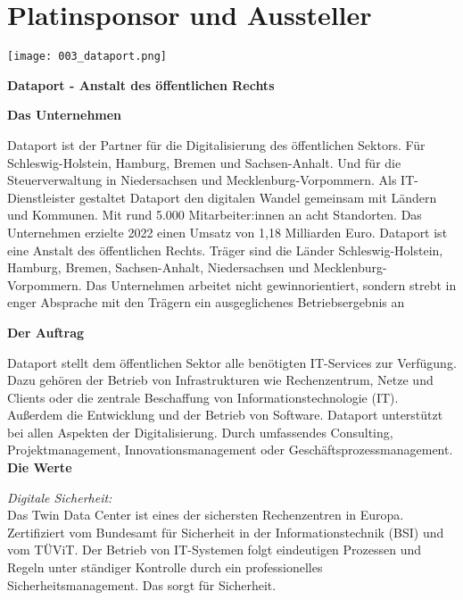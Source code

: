 \section*{Platinsponsor und Aussteller}
  \texttt{[image: 003\_dataport.png]}
  \vspace{1.0\baselineskip}
  
\noindent
    {\bfseries Dataport - Anstalt des öffentlichen Rechts}
    \vspace{1.0\baselineskip}
    
\noindent
    {\bfseries Das Unternehmen}
    
\noindent    
Dataport ist der Partner für die Digitalisierung des öffentlichen Sektors. Für Schleswig-Holstein, Hamburg, Bremen und Sachsen-Anhalt. Und für die Steuerverwaltung in Niedersachsen und Meck\-lenburg-Vorpommern. Als IT-Dienstleister gestaltet Dataport den digitalen Wandel gemeinsam mit Ländern und Kommunen. Mit rund 5.000 Mitarbeiter:innen an acht Standorten. Das Unternehmen erzielte 2022 einen Umsatz von 1,18 Milliarden Euro.    
Dataport ist eine Anstalt des öffentlichen Rechts. Träger sind die Länder Schleswig-Holstein, Hamburg, Bremen, Sachsen-Anhalt, Niedersachsen und Meck\-lenburg-Vorpommern. Das Unternehmen arbeitet nicht gewinnorientiert, sondern strebt in enger Absprache mit den Trägern ein ausgeglichenes Betriebsergebnis an
\vspace{1.0\baselineskip}

\noindent
{\bfseries Der Auftrag}

\noindent
Dataport stellt dem öffentlichen Sektor alle benötigten IT-Services zur Verfügung. Dazu gehören der Betrieb von Infrastrukturen wie Rechenzentrum, Netze und Clients oder die zentrale Beschaffung von Informationstechnologie (IT). Außerdem die Entwicklung und der Betrieb von Software. Dataport unterstützt bei allen Aspekten der Digitalisierung. Durch umfassendes Consulting, Projektmanagement, Innovationsmanagement oder Geschäftsprozessmanagement.
\newpage
\noindent
{\bfseries Die Werte}
\vspace{1.0\baselineskip}

\noindent
{\em Digitale Sicherheit:}\\
Das Twin Data Center ist eines der sichersten Rechenzentren in Europa. Zertifiziert vom Bundesamt für Sicherheit in der Informationstechnik (BSI) und vom TÜViT. Der Betrieb von IT-Systemen folgt eindeutigen Prozessen und Regeln unter ständiger Kontrolle durch ein professionelles Sicherheitsmanagement. Das sorgt für Sicherheit.
\vspace{1.0\baselineskip}

